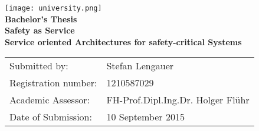 \begin{titlepage}
	\begin{center}

		\texttt{[image: university.png]}\\
		\vspace*{5cm}
		\LARGE
		\textbf{Bachelor's Thesis}\\
		\vspace{1.5cm}
		\Huge
		\textbf{Safety as Service}\\
		\LARGE
		\textbf{Service oriented Architectures for safety-critical Systems}

		\vfill

		\large
		\begin{tabular}{ll}
			Submitted by:&Stefan Lengauer\\
			Registration number:&1210587029\\
			Academic Assessor:&FH-Prof.Dipl.Ing.Dr. Holger Flühr\\
			Date of Submission:&10 September 2015\\
		\end{tabular}
	\end{center}
\end{titlepage}